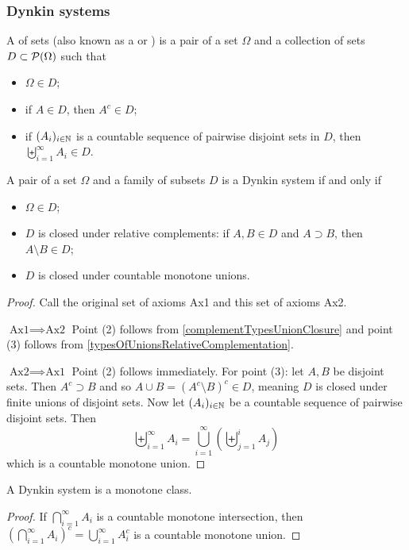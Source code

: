 \subsubsection{Dynkin systems}
\begin{definition}
A  of sets (also known as a  or ) is a pair of a set $\Omega$ and a collection of sets $D\subset\operatorname{\mathcal{P}}(\Omega)$ such that
\begin{itemize}
\item $\Omega\in D$;
\item if $A\in D$, then $A^c\in D$;
\item if $(A_i)_{i\in\mathbb{N}}$ is a countable sequence of pairwise disjoint sets in $D$, then $\biguplus_{i=1}^\infty A_i\in D$.
\end{itemize}
\end{definition}

\begin{lemma}
A pair of a set $\Omega$ and a family of subsets $D$ is a Dynkin system \textup{if and only if}
\begin{itemize}
\item $\Omega\in D$;
\item $D$ is closed under relative complements: if $A,B\in D$ and $A\supset B$, then $A\setminus B\in D$;
\item $D$ is closed under countable monotone unions.
\end{itemize}
\end{lemma}
\begin{proof}
Call the original set of axioms Ax1 and this set of axioms Ax2.

$\boxed{\text{Ax1}\implies\text{Ax2}}$ Point (2) follows from \ref{complementTypesUnionClosure} and point (3) follows from \ref{typesOfUnionsRelativeComplementation}.

$\boxed{\text{Ax2}\implies\text{Ax1}}$ Point (2) follows immediately. For point (3): let $A,B$ be disjoint sets. Then $A^c \supset B$ and so $A\cup B = (A^c\setminus B)^c \in D$, meaning $D$ is closed under finite unions of disjoint sets. Now let $(A_i)_{i\in\mathbb{N}}$ be a countable sequence of pairwise disjoint sets. Then
\[ \biguplus_{i=1}^\infty A_i = \bigcup_{i=1}^\infty \left(\biguplus_{j=1}^i A_j\right) \]
which is a countable monotone union.
\end{proof}

\begin{lemma}
A Dynkin system is a monotone class.
\end{lemma}
\begin{proof}
If $\bigcap_{i=1}^\infty A_i$ is a countable monotone intersection, then $\left(\bigcap_{i=1}^\infty A_i\right)^c = \bigcup_{i=1}^\infty A_i^c$ is a countable monotone union.
\end{proof}

